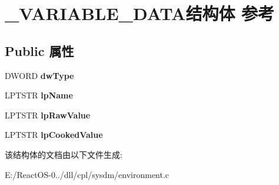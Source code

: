 \hypertarget{struct___v_a_r_i_a_b_l_e___d_a_t_a}{}\section{\+\_\+\+V\+A\+R\+I\+A\+B\+L\+E\+\_\+\+D\+A\+T\+A结构体 参考}
\label{struct___v_a_r_i_a_b_l_e___d_a_t_a}
\subsection*{Public 属性}
\begin{DoxyCompactItemize}
\item 
\mbox{\label{struct___v_a_r_i_a_b_l_e___d_a_t_a_af2cad3bad1a2a406bbe5c549d2011b35}} 
D\+W\+O\+RD {\bfseries dw\+Type}
\item 
\mbox{\label{struct___v_a_r_i_a_b_l_e___d_a_t_a_afc3b5a64bd0d842e254e56959ac5076d}} 
L\+P\+T\+S\+TR {\bfseries lp\+Name}
\item 
\mbox{\label{struct___v_a_r_i_a_b_l_e___d_a_t_a_a68dfa18819b5ffe13f6ad953b1331c13}} 
L\+P\+T\+S\+TR {\bfseries lp\+Raw\+Value}
\item 
\mbox{\label{struct___v_a_r_i_a_b_l_e___d_a_t_a_a464d4080cf613ff1cea977eb4c536a53}} 
L\+P\+T\+S\+TR {\bfseries lp\+Cooked\+Value}
\end{DoxyCompactItemize}


该结构体的文档由以下文件生成\+:\begin{DoxyCompactItemize}
\item 
E\+:/\+React\+O\+S-\/0../dll/cpl/sysdm/environment.\+c\end{DoxyCompactItemize}
